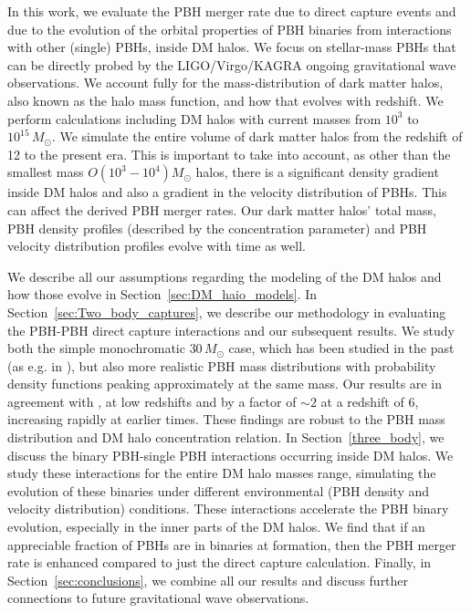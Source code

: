 \documentclass[aps, prd, reprint, nofootinbib]{revtex4-2}
\begin{document}
In this work, we evaluate the PBH merger rate due to direct capture events and due to the evolution of the orbital properties of PBH binaries from interactions with other (single) PBHs, inside DM halos.  We focus on stellar-mass PBHs that can be directly probed by the LIGO/Virgo/KAGRA ongoing gravitational wave observations.
We account fully for the mass-distribution of dark matter halos, also known as the halo mass function, and how that evolves with redshift. We perform calculations including DM halos with current masses from $10^{3}$ to $10^{15} \, M_{\odot}$. 
We simulate the entire volume of dark matter halos from the redshift of 12 to the present era. This is important to take into account, as other than the smallest mass $O(10^3-10^{4}) M_{\odot}$ halos, there is a significant density gradient inside DM halos and also a gradient in the velocity distribution of PBHs. This can affect the derived PBH merger rates. Our dark matter halos' total mass, PBH density profiles (described by the concentration parameter) and PBH velocity distribution profiles evolve with time as well.  

We describe all our assumptions regarding the modeling of the DM halos and how those evolve in Section~\ref{sec:DM_haio_models}.
In Section~\ref{sec:Two_body_captures}, we describe our methodology in evaluating the PBH-PBH direct capture interactions and our subsequent results.
We study both the simple monochromatic $30 \, M_{\odot}$ case, which has been studied in the past (as e.g. in \cite{Bird:2016dcv}), but also more realistic PBH mass distributions with probability density functions peaking approximately at the same mass. Our results are in agreement with \cite{Bird:2016dcv, Mandic}, at low redshifts and by a factor of $\sim 2$ at a redshift of 6, increasing rapidly at earlier times.
These findings are robust to the PBH mass distribution and DM halo concentration relation. 
In Section~\ref{three_body}, we discuss the binary PBH-single PBH interactions occurring inside DM halos. We study these interactions for the entire DM halo masses range, simulating the evolution of these binaries under different environmental (PBH density and velocity distribution) conditions. These interactions accelerate the PBH binary evolution, especially in the inner parts of the DM halos. We find that if an appreciable fraction of PBHs are in binaries at formation, then the PBH merger rate is enhanced compared to just the direct capture calculation. 
Finally, in Section~\ref{sec:conclusions}, we combine all our results and discuss further connections to future gravitational wave observations.
\end{document}
